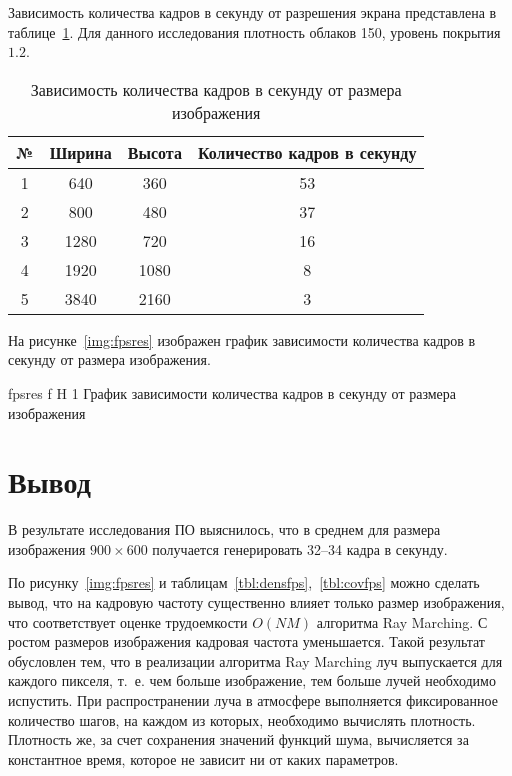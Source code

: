 Зависимость количества кадров в секунду от разрешения экрана представлена в таблице~\ref{tbl:resfps}. Для данного исследования плотность облаков 150, уровень покрытия $1.2$.

\begin{table}[H]
	\begin{center}
		\begin{threeparttable}
			\captionsetup{justification=raggedright,singlelinecheck=off}
			\caption{Зависимость количества кадров в секунду от размера изображения}
			\label{tbl:resfps}
			\begin{tabular}{|c|c|c|c|}
				\hline
				№ & Ширина & Высота & Количество кадров в секунду \\
				\hline
				1 & 640 & 360 & 53 \\
				\hline
				2 & 800 & 480 & 37 \\
				\hline
				3 & 1280 & 720 & 16 \\
				\hline
				4 & 1920 & 1080 & 8 \\
				\hline
				5 & 3840 & 2160 & 3 \\
				\hline
			\end{tabular}
		\end{threeparttable}
	\end{center}
\end{table}

На рисунке~\ref{img:fpsres} изображен график зависимости количества кадров в секунду от размера изображения.

{fpsres} %
{f} %
{H} %
{1\textwidth} %
{График зависимости количества кадров в секунду от размера изображения} %

\section*{Вывод}

В результате исследования ПО выяснилось, что в среднем для размера изображения $900 \times 600$ получается генерировать 32--34 кадра в секунду.

По рисунку~\ref{img:fpsres} и таблицам~\ref{tbl:densfps},~\ref{tbl:covfps} можно сделать вывод, что на кадровую частоту существенно влияет только размер изображения, что соответствует оценке трудоемкости $O(NM)$ алгоритма Ray Marching. 
С ростом размеров изображения кадровая частота уменьшается. Такой результат обусловлен тем, что в реализации алгоритма Ray Marching луч выпускается для каждого пикселя, т.~е. чем больше изображение, тем больше лучей необходимо испустить. При распространении луча в атмосфере выполняется фиксированное количество шагов, на каждом из которых, необходимо вычислять плотность. Плотность же, за счет сохранения значений функций шума, вычисляется за константное время, которое не зависит ни от каких параметров.